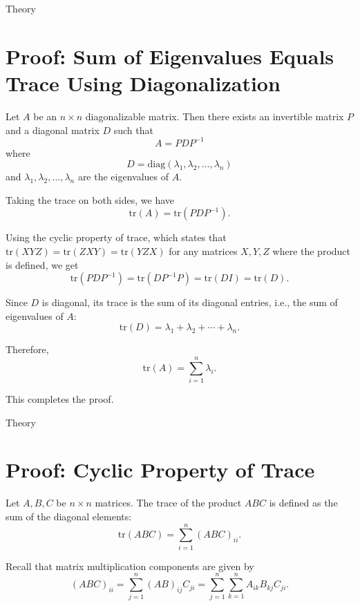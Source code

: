 \documentclass{beamer}
\begin{document}
\begin{frame}{Theory}
    

\section*{Proof: Sum of Eigenvalues Equals Trace Using Diagonalization}

Let \(A\) be an \(n \times n\) diagonalizable matrix. Then there exists an invertible matrix \(P\) and a diagonal matrix \(D\) such that
\[
A = P D P^{-1}
\]
where
\[
D = \mathrm{diag}(\lambda_1, \lambda_2, \ldots, \lambda_n)
\]
and \(\lambda_1, \lambda_2, \ldots, \lambda_n\) are the eigenvalues of \(A\).

\bigskip

Taking the trace on both sides, we have
\[
\mathrm{tr}(A) = \mathrm{tr}(P D P^{-1}).
\]
\end{frame}
\begin{frame}[Theory]
Using the cyclic property of trace, which states that \(\mathrm{tr}(XYZ) = \mathrm{tr}(ZXY) = \mathrm{tr}(YZX)\) for any matrices \(X, Y, Z\) where the product is defined, we get
\[
\mathrm{tr}(P D P^{-1}) = \mathrm{tr}(D P^{-1} P) = \mathrm{tr}(D I) = \mathrm{tr}(D).
\]

Since \(D\) is diagonal, its trace is the sum of its diagonal entries, i.e., the sum of eigenvalues of \(A\):
\[
\mathrm{tr}(D) = \lambda_1 + \lambda_2 + \cdots + \lambda_n.
\]

Therefore,
\[
\boxed{
\mathrm{tr}(A) = \sum_{i=1}^n \lambda_i.
}
\]

This completes the proof.



\end{frame}
\begin{frame}{Theory}
  
\section*{Proof: Cyclic Property of Trace}

Let \(A, B, C\) be \(n \times n\) matrices. The trace of the product \(ABC\) is defined as the sum of the diagonal elements:
\[
\mathrm{tr}(ABC) = \sum_{i=1}^n (ABC)_{ii}.
\]

\bigskip

Recall that matrix multiplication components are given by
\[
(ABC)_{ii} = \sum_{j=1}^n (AB)_{ij} C_{ji} = \sum_{j=1}^n \sum_{k=1}^n A_{ik} B_{kj} C_{ji}.
\]
\end{frame}
\end{document}
